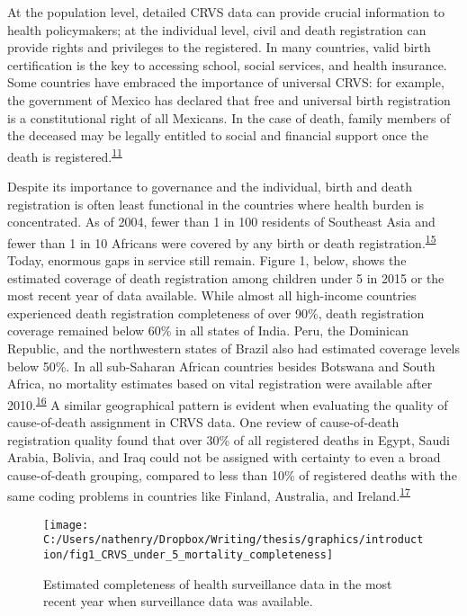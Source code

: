 \documentclass[
]{article}
\begin{document}
At the population level, detailed CRVS data can provide crucial information to health policymakers; at the individual level, civil and death registration can provide rights and privileges to the registered. In many countries, valid birth certification is the key to accessing school, social services, and health insurance. Some countries have embraced the importance of universal CRVS: for example, the government of Mexico has declared that free and universal birth registration is a constitutional right of all Mexicans. In the case of death, family members of the deceased may be legally entitled to social and financial support once the death is registered.\textsuperscript{\protect\hyperlink{ref-Setel2007}{11}}

Despite its importance to governance and the individual, birth and death registration is often least functional in the countries where health burden is concentrated. As of 2004, fewer than 1 in 100 residents of Southeast Asia and fewer than 1 in 10 Africans were covered by any birth or death registration.\textsuperscript{\protect\hyperlink{ref-Mahapatra2007}{15}} Today, enormous gaps in service still remain. Figure 1, below, shows the estimated coverage of death registration among children under 5 in 2015 or the most recent year of data available. While almost all high-income countries experienced death registration completeness of over 90\%, death registration coverage remained below 60\% in all states of India. Peru, the Dominican Republic, and the northwestern states of Brazil also had estimated coverage levels below 50\%. In all sub-Saharan African countries besides Botswana and South Africa, no mortality estimates based on vital registration were available after 2010.\textsuperscript{\protect\hyperlink{ref-Roth2018}{16}} A similar geographical pattern is evident when evaluating the quality of cause-of-death assignment in CRVS data. One review of cause-of-death registration quality found that over 30\% of all registered deaths in Egypt, Saudi Arabia, Bolivia, and Iraq could not be assigned with certainty to even a broad cause-of-death grouping, compared to less than 10\% of registered deaths with the same coding problems in countries like Finland, Australia, and Ireland.\textsuperscript{\protect\hyperlink{ref-Johnson2021}{17}}

\begin{figure}[!ht]

{\centering \texttt{[image: C:/Users/nathenry/Dropbox/Writing/thesis/graphics/introduction/fig1\_CRVS\_under\_5\_mortality\_completeness]} 

}

\caption{Estimated completeness of health surveillance data in the most recent year when surveillance data was available.}\label{fig:fig1}
\end{figure}
\end{document}
